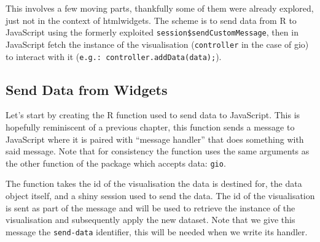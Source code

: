 \documentclass[
]{krantz}
\makeatletter
\newenvironment{Shaded}{\begin{snugshade}}{\end{snugshade}}
\newcommand{\CommentTok}[1]{\textcolor[rgb]{0.37,0.37,0.37}{\textit{#1}}}
\newcommand{\ControlFlowTok}[1]{\textcolor[rgb]{0.27,0.27,0.27}{\textbf{#1}}}
\newcommand{\DataTypeTok}[1]{\textcolor[rgb]{0.27,0.27,0.27}{#1}}
\newcommand{\KeywordTok}[1]{\textcolor[rgb]{0.27,0.27,0.27}{\textbf{#1}}}
\newcommand{\NormalTok}[1]{#1}
\newcommand{\OperatorTok}[1]{\textcolor[rgb]{0.43,0.43,0.43}{\textbf{#1}}}
\newcommand{\StringTok}[1]{\textcolor[rgb]{0.5,0.5,0.5}{#1}}
\newenvironment{kframe}{%
\medskip{}
\setlength{\fboxsep}{.8em}
 \def\at@end@of@kframe{}%
 \ifinner\ifhmode%
  \def\at@end@of@kframe{\end{minipage}}%
  \begin{minipage}{\columnwidth}%
 \fi\fi%
 \def\FrameCommand##1{\hskip\@totalleftmargin \hskip-\fboxsep
 \colorbox{shadecolor}{##1}\hskip-\fboxsep
     \hskip-\linewidth \hskip-\@totalleftmargin \hskip\columnwidth}%
 \MakeFramed {\advance\hsize-\width
   \@totalleftmargin\z@ \linewidth\hsize
   \@setminipage}}%
 {\par\unskip\endMakeFramed%
 \at@end@of@kframe}
\renewenvironment{Shaded}{\begin{kframe}}{\end{kframe}}
\makeatother
\begin{document}
This involves a few moving parts, thankfully some of them were already explored, just not in the context of htmlwidgets. The scheme is to send data from R to JavaScript using the formerly exploited \texttt{session\$sendCustomMessage}, then in JavaScript fetch the instance of the visualisation (\texttt{controller} in the case of gio) to interact with it (\texttt{e.g.:\ controller.addData(data);}).

\hypertarget{shiny-widgets-send-data}{%
\subsection{Send Data from Widgets}\label{shiny-widgets-send-data}}

Let's start by creating the R function used to send data to JavaScript. This is hopefully reminiscent of a previous chapter, this function sends a message to JavaScript where it is paired with ``message handler'' that does something with said message. Note that for consistency the function uses the same arguments as the other function of the package which accepts data: \texttt{gio}.

\begin{Shaded}
\end{Shaded}

The function takes the id of the visualisation the data is destined for, the data object itself, and a shiny session used to send the data. The id of the visualisation is sent as part of the message and will be used to retrieve the instance of the visualisation and subsequently apply the new dataset. Note that we give this message the \texttt{send-data} identifier, this will be needed when we write its handler.
\end{document}
